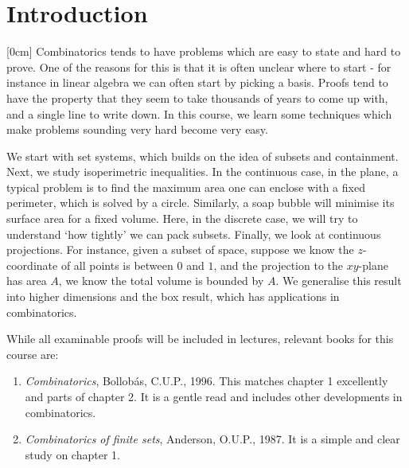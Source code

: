 \documentclass{article}
\begin{document}
\maketitle

\tableofcontents

\clearpage
\section{Introduction}
[0cm]
Combinatorics tends to have problems which are easy to state and hard to prove.
One of the reasons for this is that it is often unclear where to start - for instance in linear algebra we can often start by picking a basis.
Proofs tend to have the property that they seem to take thousands of years to come up with, and a single line to write down.
In this course, we learn some techniques which make problems sounding very hard become very easy.

We start with set systems, which builds on the idea of subsets and containment.
Next, we study isoperimetric inequalities.
In the continuous case, in the plane, a typical problem is to find the maximum area one can enclose with a fixed perimeter, which is solved by a circle.
Similarly, a soap bubble will minimise its surface area for a fixed volume.
Here, in the discrete case, we will try to understand `how tightly' we can pack subsets.
Finally, we look at continuous projections.
For instance, given a subset of space, suppose we know the $z$-coordinate of all points is between $0$ and $1$, and the projection to the $xy$-plane has area $A$, we know the total volume is bounded by $A$.
We generalise this result into higher dimensions and the box result, which has applications in combinatorics.

While all examinable proofs will be included in lectures, relevant books for this course are:
\begin{enumerate}
  \item \emph{Combinatorics}, Bollob\'{a}s, C.U.P., 1996. This matches chapter 1 excellently and parts of chapter 2. It is a gentle read and includes other developments in combinatorics.
  \item \emph{Combinatorics of finite sets}, Anderson, O.U.P., 1987. It is a simple and clear study on chapter 1.
\end{enumerate}

\clearpage
\end{document}
